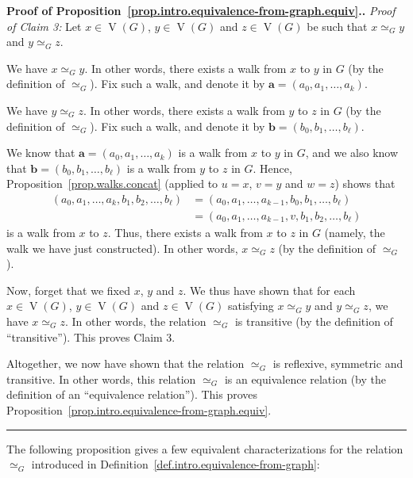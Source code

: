 \documentclass[numbers=enddot,12pt,final,onecolumn,notitlepage]{scrartcl}%
\theoremstyle{definition}
\newenvironment{proof}[1][Proof]{\noindent\textbf{#1.} }{\ \rule{0.5em}{0.5em}}
\newcommand{\tup}[1]{\left( #1 \right)}
\newcommand{\verts}[1]{\operatorname{V}\left( #1 \right)}
\begin{document}
\begin{proof}[Proof of
Proposition~\ref{prop.intro.equivalence-from-graph.equiv}.]
\textit{Proof of Claim 3:} Let $x \in \verts{G}$, $y \in \verts{G}$
and $z \in \verts{G}$ be such that $x \simeq_G y$ and
$y \simeq_G z$.

We have $x \simeq_G y$. In other words, there exists a walk from $x$
to $y$ in $G$ (by the definition of $\simeq_G$). Fix such a walk, and
denote it by $\mathbf{a} = \tup{a_0, a_1, \ldots, a_k}$.

We have $y \simeq_G z$. In other words, there exists a walk from $y$
to $z$ in $G$ (by the definition of $\simeq_G$). Fix such a walk, and
denote it by $\mathbf{b} = \tup{b_0, b_1, \ldots, b_\ell}$.

We know that $\mathbf{a} = \tup{a_0, a_1, \ldots, a_k}$ is a walk from
$x$ to $y$ in $G$, and we also know that
$\mathbf{b} = \tup{b_0, b_1, \ldots, b_\ell}$ is a walk from $y$ to
$z$ in $G$. Hence, Proposition~\ref{prop.walks.concat} (applied to
$u = x$, $v = y$ and $w = z$) shows that
\begin{align*}
\tup{a_0, a_1, \ldots, a_k, b_1, b_2, \ldots, b_\ell}
&= \tup{a_0, a_1, \ldots, a_{k-1}, b_0, b_1, \ldots, b_\ell} \\
&= \tup{a_0, a_1, \ldots, a_{k-1}, v, b_1, b_2, \ldots, b_\ell}
\end{align*}
is a walk from $x$ to $z$. Thus, there exists a walk from $x$ to $z$
in $G$ (namely, the walk we have just constructed). In other words,
$x \simeq_G z$ (by the definition of $\simeq_G$).

Now, forget that we fixed $x$, $y$ and $z$. We thus have shown that
for each $x \in \verts{G}$, $y \in \verts{G}$ and $z \in \verts{G}$
satisfying $x \simeq_G y$ and $y \simeq_G z$, we have $x \simeq_G z$.
In other words, the relation $\simeq_G$ is transitive (by the
definition of ``transitive''). This proves Claim 3.

Altogether, we now have shown that the relation $\simeq_G$ is
reflexive, symmetric and transitive. In other words, this relation
$\simeq_G$ is an equivalence relation (by the definition of an
``equivalence relation'').
This proves Proposition~\ref{prop.intro.equivalence-from-graph.equiv}.
\end{proof}

The following proposition gives a few equivalent characterizations for
the relation $\simeq_G$ introduced in
Definition~\ref{def.intro.equivalence-from-graph}:
\end{document}
